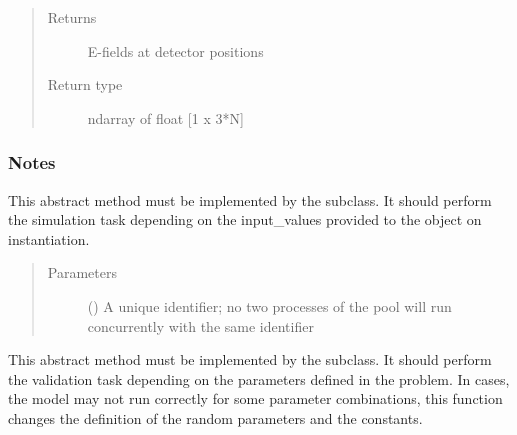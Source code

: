 \documentclass[letterpaper,10pt,english,openany,oneside]{sphinxmanual}
\begin{document}
\begin{fulllineitems}
\begin{quote}
\begin{description}
\begin{itemize}
\end{itemize}

\item[{Returns}] \leavevmode
{} \textendash{} E-fields at detector positions

\item[{Return type}] \leavevmode
ndarray of float {[}1 x 3*N{]}

\end{description}\end{quote}
\subsubsection*{Notes}

\begin{fulllineitems}
\label{\detokenize{pygpc.testfunctions:pygpc.testfunctions.testfunctions.TMSEfieldSphere.simulate}}
This abstract method must be implemented by the subclass.
It should perform the simulation task depending on the input\_values provided to the object on instantiation.
\begin{quote}\begin{description}
\item[{Parameters}] \leavevmode
{} () \textendash{} A unique identifier; no two processes of the pool will run concurrently with the same identifier

\end{description}\end{quote}

\end{fulllineitems}


\begin{fulllineitems}
\label{\detokenize{pygpc.testfunctions:pygpc.testfunctions.testfunctions.TMSEfieldSphere.validate}}
This abstract method must be implemented by the subclass.
It should perform the validation task depending on the parameters defined in the problem.
In cases, the model may not run correctly for some parameter combinations, this function changes the definition
of the random parameters and the constants.

\end{fulllineitems}


\end{fulllineitems}
\end{document}
